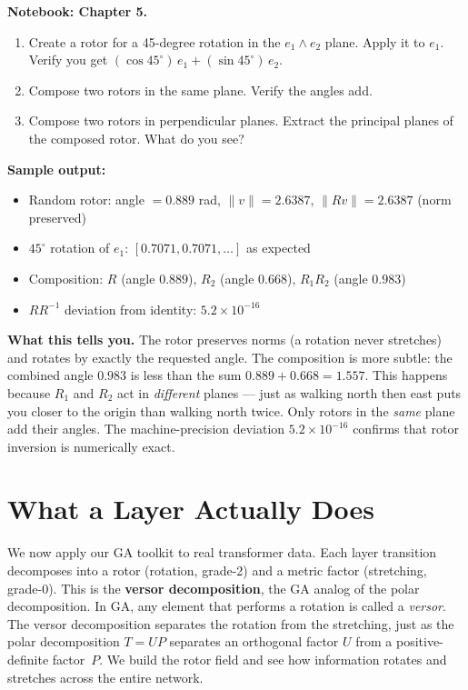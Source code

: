 \documentclass[11pt, twoside, openright]{memoir}
\newcommand{\op}{\wedge}          %
\numberwithin{equation}{chapter}
\begin{document}
\begin{tryit}
\textbf{Notebook: Chapter 5.}
\begin{enumerate}[nosep]
\item Create a rotor for a 45-degree rotation in the $e_1 \op e_2$
  plane.  Apply it to $e_1$.  Verify you get
  $(\cos 45^\circ)\,e_1 + (\sin 45^\circ)\,e_2$.
\item Compose two rotors in the same plane.  Verify the angles add.
\item Compose two rotors in perpendicular planes.  Extract the
  principal planes of the composed rotor.  What do you see?
\end{enumerate}

\medskip
\textbf{Sample output:}
\begin{itemize}[nosep]
\item Random rotor: angle $= 0.889$ rad, $\|v\| = 2.6387$, $\|Rv\| = 2.6387$ (norm preserved)
\item $45^\circ$ rotation of $e_1$: $[0.7071, 0.7071, \ldots]$ as expected
\item Composition: $R$ (angle $0.889$), $R_2$ (angle $0.668$), $R_1 R_2$ (angle $0.983$)
\item $R R^{-1}$ deviation from identity: $5.2 \times 10^{-16}$
\end{itemize}

\medskip
\textbf{What this tells you.}
The rotor preserves norms (a rotation never stretches) and rotates by exactly the requested angle. The composition is more subtle: the combined angle $0.983$ is less than the sum $0.889 + 0.668 = 1.557$. This happens because $R_1$ and $R_2$ act in \emph{different} planes --- just as walking north then east puts you closer to the origin than walking north twice. Only rotors in the \emph{same} plane add their angles. The machine-precision deviation $5.2 \times 10^{-16}$ confirms that rotor inversion is numerically exact.
\end{tryit}


\chapter{What a Layer Actually Does}
\label{chap:versor}

\begin{whycare}
We now apply our GA toolkit to real transformer data.  Each layer
transition decomposes into a rotor (rotation, grade-2) and a metric
factor (stretching, grade-0).  This is the \textbf{versor decomposition},
the GA analog of the polar decomposition.  In GA, any element that
performs a rotation is called a \emph{versor}.  The versor decomposition
separates the rotation from the stretching, just as the polar
decomposition $T = UP$ separates an orthogonal factor $U$ from a
positive-definite factor~$P$.  We build the rotor field and
see how information rotates and stretches across the entire network.
\end{whycare}
\end{document}
